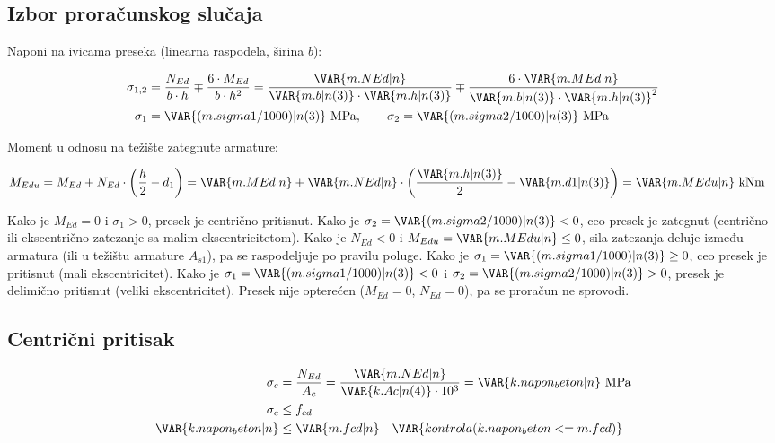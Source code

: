 \subsection{Izbor proračunskog slučaja}

Naponi na ivicama preseka (linearna raspodela, širina $b$):

\begin{align*}
\sigma_{1,2} &= \frac{N_{Ed}}{b \cdot h} \mp \frac{6 \cdot M_{Ed}}{b \cdot h^2} = \frac{\VAR{m.NEd|n}}{\VAR{m.b|n(3)} \cdot \VAR{m.h|n(3)}} \mp \frac{6 \cdot \VAR{m.MEd|n}}{\VAR{m.b|n(3)} \cdot \VAR{m.h|n(3)}^2} \\
\sigma_1 &= \VAR{(m.sigma1/1000)|n(3)} \ \mathrm{MPa}, \qquad \sigma_2 = \VAR{(m.sigma2/1000)|n(3)} \ \mathrm{MPa}
\end{align*}

Moment u odnosu na težište zategnute armature:

\begin{align*}
M_{Edu} &= M_{Ed} + N_{Ed} \cdot \left(\frac{h}{2} - d_1\right) = \VAR{m.MEd|n} + \VAR{m.NEd|n} \cdot \left(\frac{\VAR{m.h|n(3)}}{2} - \VAR{m.d1|n(3)}\right) = \VAR{m.MEdu|n} \ \mathrm{kNm}
\end{align*}

Kako je $M_{Ed} = 0$ i $\sigma_1 > 0$, presek je centrično pritisnut.
Kako je $\sigma_2 = \VAR{(m.sigma2/1000)|n(3)} < 0$, ceo presek je zategnut (centrično ili ekscentrično zatezanje sa malim ekscentricitetom).
Kako je $N_{Ed} < 0$ i $M_{Edu} = \VAR{m.MEdu|n} \leq 0$, sila zatezanja deluje između armatura (ili u težištu armature $A_{s1}$), pa se raspodeljuje po pravilu poluge.
Kako je $\sigma_1 = \VAR{(m.sigma1/1000)|n(3)} \geq 0$, ceo presek je pritisnut (mali ekscentricitet).
Kako je $\sigma_1 = \VAR{(m.sigma1/1000)|n(3)} < 0$ i $\sigma_2 = \VAR{(m.sigma2/1000)|n(3)} > 0$, presek je delimično pritisnut (veliki ekscentricitet).
Presek nije opterećen ($M_{Ed} = 0$, $N_{Ed} = 0$), pa se proračun ne sprovodi.

\subsection{Centrični pritisak}

\begin{align*}
\sigma_c &= \frac{N_{Ed}}{A_c} = \frac{\VAR{m.NEd|n}}{\VAR{k.Ac|n(4)} \cdot 10^3} = \VAR{k.napon_beton|n} \ \mathrm{MPa} \\
\sigma_c &\leq f_{cd} \\
\VAR{k.napon_beton|n} &\leq \VAR{m.fcd|n} \quad \VAR{kontrola(k.napon_beton <= m.fcd)}
\end{align*}

